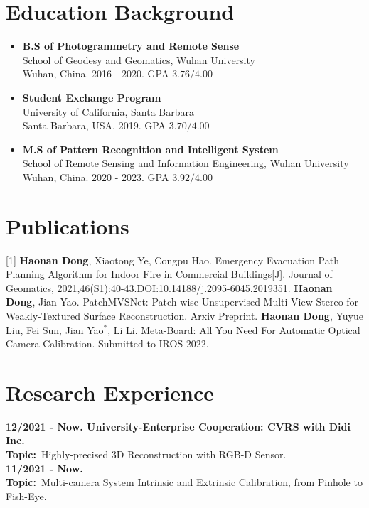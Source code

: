 \documentclass[a4paper]{article}
\begin{document}
\section{Education Background}
\vspace{-0.5em}
\begin{itemize}[itemsep = -0.5em,topsep = 0em]
      \item \textbf{B.S of Photogrammetry and Remote Sense}
            \\ School of Geodesy and Geomatics, Wuhan University\\ Wuhan, China. 2016 - 2020. GPA $3.76/4.00$
      \item \textbf{Student Exchange Program}
            \\ University of California, Santa Barbara\\ Santa Barbara, USA. 2019. GPA $3.70/4.00$
      \item \textbf{M.S of Pattern Recognition and Intelligent System}
            \\ School of Remote Sensing and Information Engineering, Wuhan University\\ Wuhan, China. 2020 - 2023. GPA $3.92/4.00$
\end{itemize}


\section{Publications}
\vspace{-0.5em}
[1] \textbf{Haonan Dong}, Xiaotong Ye, Congpu Hao. Emergency Evacuation Path Planning Algorithm for Indoor Fire in Commercial Buildings[J]. Journal of Geomatics, 2021,46(S1):40-43.DOI:10.14188/j.2095-6045.2019351.
\newline
[2] \textbf{Haonan Dong}, Jian Yao. PatchMVSNet: Patch-wise Unsupervised Multi-View Stereo for
Weakly-Textured Surface Reconstruction. Arxiv Preprint.
\newline
[3] \textbf{Haonan Dong}, Yuyue Liu, Fei Sun, Jian Yao$^{*}$, Li Li. Meta-Board: All You Need For Automatic Optical Camera Calibration. Submitted to IROS 2022.


\section{Research Experience}
\vspace{-0.5em}
\textbf{12/2021 - Now. University-Enterprise Cooperation: CVRS with Didi Inc.}\\
\textbf{Topic:}\ Highly-precised 3D Reconstruction with RGB-D Sensor.\\
\textbf{11/2021 - Now.}\\
\textbf{Topic:}\ Multi-camera System Intrinsic and Extrinsic Calibration, from Pinhole to Fish-Eye.\\
\end{document}
